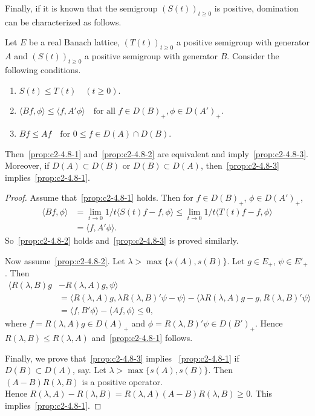 Finally, if it is known that the semigroup $(S(t))_{t \geq 0}$ is positive,
domination can be characterized as follows.

\begin{proposition}\label{prop:c2-4.8}
Let $E$ be a real Banach lattice, $(T(t))_{t \geq 0}$ a
positive semigroup with generator $A$ and $(S(t))_{t \geq 0}$ a positive
semigroup with generator $B$. Consider the following conditions.
\begin{enumerate}[\upshape (a)]
\item \label{prop:c2-4.8-1}
$S(t) \leq T(t) \quad (t \geq 0)$.
\item \label{prop:c2-4.8-2}
$\langle Bf,\phi\rangle \leq \langle f,A'\phi\rangle \quad \text{for all } f \in D(B)_{+}, \phi \in D(A')_{+}$.
\item \label{prop:c2-4.8-3}
$Bf \leq Af \quad \text{for } 0 \leq f \in D(A) \cap D(B)$.
\end{enumerate}
Then~\ref{prop:c2-4.8-1} and~\ref{prop:c2-4.8-2}  are equivalent and imply~\ref{prop:c2-4.8-3}.
Moreover, if\/ $D(A) \subset D(B)$ or $D(B) \subset D(A)$, then~\ref{prop:c2-4.8-3}   implies~\ref{prop:c2-4.8-1}.
\end{proposition}

\begin{proof}
Assume that~\ref{prop:c2-4.8-1}   holds. 
Then for $f \in D(B)_{+}$, $\phi \in D(A')_{+}$,
\begin{align*}
\langle Bf,\phi\rangle &= \lim_{t \to 0} 1/t \langle S(t)f - f, \phi\rangle \leq \lim_{t \to 0} 1/t \langle T(t)f - f, \phi\rangle\\
&= \langle f, A'\phi\rangle.
\end{align*}
So~\ref{prop:c2-4.8-2}   holds and~\ref{prop:c2-4.8-3}   is proved similarly.

Now assume~\ref{prop:c2-4.8-2}. 
Let $\lambda > \max \{s(A), s(B)\}$. Let $g \in E_{+}$, $\psi \in E'_{+}$.
Then 
\begin{align*}
\langle R(\lambda,B)g &- R(\lambda,A)g, \psi\rangle\\
&= \langle R(\lambda,A)g, \lambda R(\lambda,B)'\psi - \psi\rangle - \langle \lambda R(\lambda,A)g - g, R(\lambda,B)'\psi\rangle\\
&= \langle f, B'\phi\rangle - \langle Af, \phi\rangle \leq 0,
\end{align*}
where $f = R(\lambda,A)g \in D(A)_{+}$ and $\phi = R(\lambda,B)'\psi \in D(B')_{+}$. 
Hence $R(\lambda,B) \leq R(\lambda,A)$ and~\ref{prop:c2-4.8-1}   follows.

Finally, we prove that~\ref{prop:c2-4.8-3}   implies ~\ref{prop:c2-4.8-1}   if\/ $D(B) \subset D(A)$, say.
Let $\lambda > \max\{s(A),s(B)\}$. 
Then $(A - B)R(\lambda,B)$ is a positive operator.\\
Hence $R(\lambda,A) - R(\lambda,B) = R(\lambda,A)(A - B)R(\lambda,B) \geq 0$. 
This implies~\ref{prop:c2-4.8-1}.
\end{proof}

